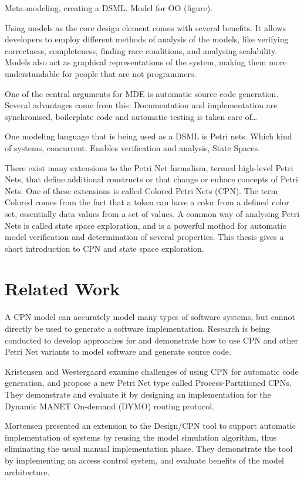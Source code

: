 Meta-modeling, creating a DSML. Model for OO (figure). 

Using models as the core design element comes with several benefits. It allows
developers to employ different methods of analysis of the models, like verifying
correctness, completeness, finding race conditions, and analysing scalability.
Models also act as graphical representations of the system, making them more understandable
for people that are not programmers. 

One of the central arguments for MDE is automatic source code generation.
Several advantages come from this: Documentation and implementation are 
synchronised, boilerplate code and automatic testing is taken care of\ldots
{}

One modeling language that is being used as a DSML is Petri nets. Which kind of
systems, concurrent.
Enables verification and analysis, State Spaces. 

There exist many extensions to the Petri Net formalism, termed high-level Petri
Nets, that define additional constructs or that change or enhace concepts of
Petri Nets. One of these extensions is called Colored Petri Nets (CPN). The term
Colored comes from the fact that a token can have a color from a defined color
set, essentially data values from a set of values. A common way of analysing
Petri Nets is called state space exploration, and is a powerful mothod for
automatic model verification and determination of several properties. This
thesis gives a short introduction to CPN and state space exploration.

\section{Related Work}

A CPN model can accurately model many types of software systems, but cannot
directly be used to generate a software implementation. Research is being
conducted to develop approaches for and demonstrate how to use CPN and other
Petri Net variants to model software and generate source code. 

Kristensen and Westergaard \cite{kristensen2010automatic} examine challenges of
using CPN for automatic code generation, and propose a new Petri Net type called
Process-Partitioned CPNs. They demonstrate and evaluate it by
designing an implementation for the Dynamic MANET On-demand (DYMO) routing
protocol.

Mortensen \cite{mortensen2000automatic} presented an extension to the Design/CPN
tool to support automatic implementation of systems by reusing the model
simulation algorithm, thus eliminating the usual manual implementation phase.
They demonstrate the tool by implementing an access control system, and
evaluate benefits of the model architecture.

